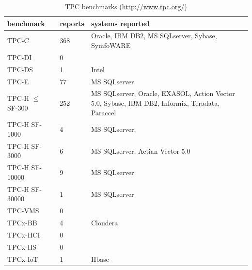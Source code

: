 \documentclass{cidr-2019}
\begin{document}
\begin{table}[t]
  {\small\addtolength{\tabcolsep}{-2.6pt}\begin{tabular*}{\columnwidth}{ | l | l | p{} |}
      \hline
      benchmark & reports & systems reported\\
      \hline
      TPC-C & 368 & Oracle, IBM DB2, MS SQLserver, Sybase, SymfoWARE\\
      TPC-DI &0 &\\
      TPC-DS &1 & Intel\\
      TPC-E &77 & MS SQLserver\\
      TPC-H $\leq$ SF-300 & 252 &MS SQLserver, Oracle, EXASOL, Action Vector 5.0, Sybase, IBM DB2, Informix, Teradata, Paraccel\\
      TPC-H SF-1000 & 4 & MS SQLserver, \\
      TPC-H SF-3000 & 6 & MS SQLserver, Actian Vector 5.0\\
      TPC-H SF-10000 & 9 & MS SQLserver \\
      TPC-H SF-30000 & 1 & MS SQLserver \\
      TPC-VMS & 0& \\
      TPCx-BB & 4& Cloudera\\
      TPCx-HCI & 0&\\
      TPCx-HS &0 &\\
      TPCx-IoT & 1& Hbase\\ %
      \hline
    \end{tabular*}}
    \caption{TPC benchmarks (\url{http://www.tpc.org/})\label{table:tpc-overview}}
\end{table}

\end{document}
